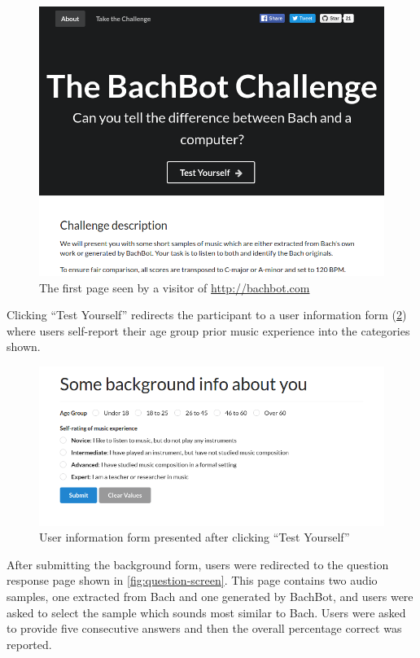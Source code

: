 \documentclass[dissertation.tex]{subfiles}
\begin{document}
\begin{figure}[htpb]
  \centering
  \includegraphics[width=1.0\linewidth]{Figures/bachbot-front-page.png}
  \caption{The first page seen by a visitor of \url{http://bachbot.com}}
  \label{fig:bachbot-front-page}
\end{figure}

Clicking ``Test Yourself'' redirects the participant to a user information form
(\cref{fig:user-info-form}) where users self-report their age
group prior music experience into the categories shown.

\begin{figure}[htpb]
  \centering
  \includegraphics[width=1.0\linewidth]{Figures/user-info-form.png}
  \caption{User information form presented after clicking ``Test Yourself''}
  \label{fig:user-info-form}
\end{figure}

After submitting the background form, users were redirected to the question
response page shown in \cref{fig:question-screen}. This page contains two
audio samples, one extracted from Bach and one generated by BachBot, and users
were asked to select the sample which sounds most similar to Bach. Users were
asked to provide five consecutive answers and then the overall percentage
correct was reported.
\end{document}
